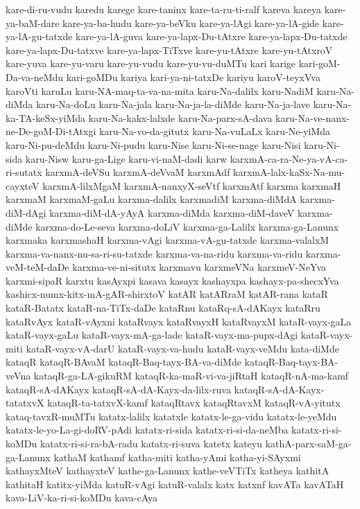 {kare-di-ru-vudu
karedu
karege
kare-taninx
kare-ta-ru-ti-ralf
kareva
kareya
kare-ya-baM-dare
kare-ya-ba-hudu
kare-ya-beVku
kare-ya-lAgi
kare-ya-lA-gide
kare-ya-lA-gu-tatxde
kare-ya-lA-guva
kare-ya-lapx-Du-tAtxre
kare-ya-lapx-Du-tatxde
kare-ya-lapx-Du-tatxve
kare-ya-lapx-TiTxve
kare-yu-tAtxre
kare-yu-tAtxroV
kare-yuva
kare-yu-varu
kare-yu-vudu
kare-yu-vu-duMTu
kari
karige
kari-goM-Da-va-neMdu
kari-goMDu
kariya
kari-ya-ni-tatxDe
kariyu
karoV-teyxVva
karoVti
karuLu
karu-NA-maq-ta-va-na-mita
karu-Na-dalilx
karu-NadiM
karu-Na-diMda
karu-Na-doLu
karu-Na-jala
karu-Na-ja-la-diMde
karu-Na-ja-lave
karu-Na-ka-TA-keSx-yiMda
karu-Na-kakx-lalxde
karu-Na-parx-sA-dava
karu-Na-ve-nanx-ne-De-goM-Di-tAtxgi
karu-Na-vo-da-gitutx
karu-Na-vuLaLx
karu-Ne-yiMda
karu-Ni-pu-deMdu
karu-Ni-pudu
karu-Nise
karu-Ni-se-nage
karu-Nisi
karu-Ni-sida
karu-Nisw
karu-ga-Lige
karu-vi-naM-dadi
karw
karxmA-ca-ra-Ne-ya-vA-ca-ri-sutatx
karxmA-deVSu
karxmA-deVvaM
karxmAdf
karxmA-lalx-kaSx-Na-mu-cayxteV
karxmA-lilxMgaM
karxmA-nanxyX-seVtf
karxmAtf
karxma
karxmaH
karxmaM
karxmaM-gaLu
karxma-dalilx
karxmadiM
karxma-diMdA
karxma-diM-dAgi
karxma-diM-dA-yAyA
karxma-diMda
karxma-diM-daveV
karxma-diMde
karxma-do-Le-seva
karxma-doLiV
karxma-ga-Lalilx
karxma-ga-Lanunx
karxmaka
karxmashaH
karxma-vAgi
karxma-vA-gu-tatxde
karxma-valalxM
karxma-va-nanx-nu-sa-ri-su-tatxde
karxma-va-na-ridu
karxma-va-ridu
karxma-veM-teM-daDe
karxma-ve-ni-situtx
karxmavu
karxmeVNa
karxmeV-NeYva
karxmi-sipaR
karxtu
kasAyxpi
kasava
kasayx
kashayxpa
kashayx-pa-shecxYva
kashicx-numx-kitx-mA-gAR-shirxtoV
katAR
katARraM
katAR-rana
kataR
kataR-Batatx
kataR-na-TiTx-daDe
kataRnu
kataRq-sA-dAKayx
kataRru
kataRvAyx
kataR-vAyxni
kataRvayx
kataRvayxH
kataRvayxM
kataR-vayx-gaLa
kataR-vayx-gaLu
kataR-vayx-mA-ga-lade
kataR-vayx-ma-pupx-dAgi
kataR-vayx-miti
kataR-vayx-vA-darU
kataR-vayx-va-hudu
kataR-vayx-veMdu
kata-diMde
kataqR
kataqR-BAvaM
kataqR-Baq-tayx-BA-va-diMde
kataqR-Baq-tayx-BA-veVna
kataqR-ga-LA-gikuRM
kataqR-ka-maR-vi-va-jiRtaH
kataqR-nA-ma-kamf
kataqR-sA-dAKayx
kataqR-sA-dA-Kayx-da-lilx-ruva
kataqR-sA-dA-Kayx-tatatxvX
kataqR-ta-tatxvX-kamf
kataqRtavx
kataqRtavxM
kataqR-vA-yitutx
kataq-tavxR-muMTu
katatx-lalilx
katatxle
katatx-le-ga-vidu
katatx-le-yeMdu
katatx-le-yo-La-gi-doRV-pAdi
katatx-ri-sida
katatx-ri-si-da-neMba
katatx-ri-si-koMDu
katatx-ri-si-ra-bA-radu
katatx-ri-suva
katetx
kateyu
kathA-parx-saM-ga-ga-Lanunx
kathaM
kathamf
katha-miti
katha-yAmi
katha-yi-SAyxmi
kathayxMteV
kathayxteV
kathe-ga-Lanunx
kathe-veVTiTx
katheya
kathitA
kathitaH
katitx-yiMda
katuR-vAgi
katuR-valalx
katx
katxnf
kavATa
kavATaH
kava-LiV-ka-ri-si-koMDu
kava-cAya
}
